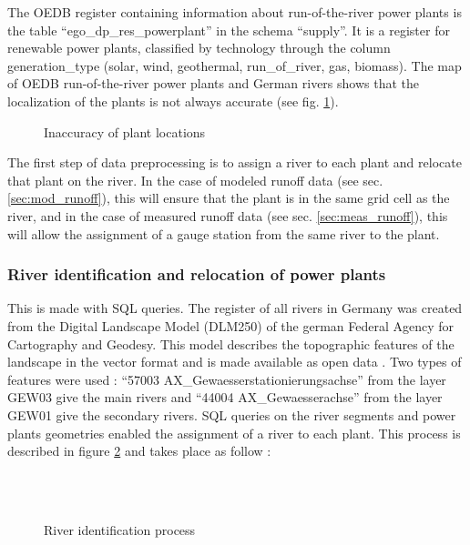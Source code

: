 The OEDB register containing information about run-of-the-river power plants is the table ``ego{\_}dp{\_}res{\_}powerplant'' in the schema ``supply''. It is a register for renewable power plants, classified by technology through the column generation{\_}type (solar, wind, geothermal, run{\_}of{\_}river, gas, biomass). \newline 
The map of OEDB run-of-the-river power plants and German rivers shows that the localization of the plants is not always accurate (see fig. \ref{pp_river_dist}).
\begin{figure}[H]
\center
{}
\caption{Inaccuracy of plant locations}
\label{pp_river_dist}
\end{figure}
The first step of data preprocessing is to assign a river to each plant and relocate that plant on the river. \newline
In the case of modeled runoff data (see sec. \ref{sec:mod_runoff}), this will ensure that the plant is in the same grid cell as the river, and in the case of measured runoff data (see sec. \ref{sec:meas_runoff}), this will allow the assignment of a gauge station from the same river to the plant.


\subsubsection*{River identification and relocation of power plants}

This is made with SQL queries. The register of all rivers in Germany was created from the Digital Landscape Model (DLM250) of the german Federal Agency for Cartography and Geodesy. This model describes the topographic features of the landscape in the vector format and is made available as open data \cite{dlm250}. \newline Two types of features were used : ``57003 AX{\_}Gewaesserstationierungsachse'' from the layer GEW03 give the main rivers and ``44004 AX{\_}Gewaesserachse'' from the layer GEW01 give the secondary rivers. \newline 
SQL queries on the river segments and power plants geometries enabled the assignment of a river to each plant. This process is described in figure \ref{river_id} and takes place as follow : 

\begin{figure}[H]
\begin{center}
   \hspace{3cm}
   \\
   \hspace{3cm}
   \\ 
\end{center}
\caption{River identification process}
\label{river_id}
\end{figure}

